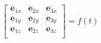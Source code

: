 \documentclass[preview]{standalone}
\begin{document}
\begin{align*}
\begin{bmatrix}\textbf{e}_{1x}&\textbf{e}_{2x}&\textbf{e}_{3x}\\\textbf{e}_{1y}&\textbf{e}_{2y}&\textbf{e}_{3y}\\\textbf{e}_{1z}&\textbf{e}_{2z}&\textbf{e}_{3z}\\\end{bmatrix}=f(t)
\end{align*}
\end{document}
